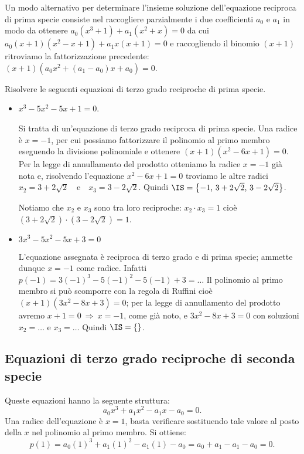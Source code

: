Un modo alternativo per determinare l'insieme soluzione dell'equazione reciproca di prima specie consiste nel raccogliere parzialmente i due coefficienti $a_0$ e $a_1$ in modo da ottenere $a_0\left(x^3+1\right)+a_1\left(x^2+x\right)=0$ da cui $a_0(x+1)\left(x^2-x+1\right)+a_1x(x+1)=0$ e raccogliendo il binomio $(x+1)$ ritroviamo la fattorizzazione precedente: $(x+1) \left(a_0x^2+(a_1-a_0)x+a_0\right)=0$.
\begin{exrig}
 \begin{esempio}
 Risolvere le seguenti equazioni di terzo grado reciproche di prima specie.

 \begin{itemize}
 \item $x^3-5x^2-5x+1=0$.

 Si tratta di un'equazione di terzo grado reciproca di prima specie. Una radice è $x=-1$, per cui possiamo fattorizzare il polinomio al primo membro eseguendo la divisione polinomiale e ottenere $(x+1)\left(x^2-6x+1\right)=0$. Per la legge di annullamento del prodotto otteniamo la radice $x=-1$ già nota e, risolvendo l'equazione $x^2-6x+1=0$ troviamo le altre radici $x_2=3+2\sqrt 2$~~e~~$x_3=3-2\sqrt 2$. Quindi $\IS=\left\{-1\text{, }3+2\sqrt 2\text{, }3-2\sqrt 2\right\}$.

 Notiamo che $x_2$ e $x_3$ sono tra loro reciproche: $x_2 \cdot x_3=1$ cioè $(3+2\sqrt 2)\cdot (3-2\sqrt 2)=1$.

 \item $3x^3-5x^2-5x+3=0$

 L'equazione assegnata è reciproca di terzo grado e di prima specie; ammette dunque $x=-1$ come radice. Infatti $p(-1)=3(-1)^3-5(-1)^2-5(-1)+3=\ldots$ Il polinomio al primo membro si può scomporre con la regola di Ruffini cioè $(x+1)\left(3x^2-8x+3\right)=0$; per la legge di annullamento del prodotto avremo $x+1=0\:\Rightarrow\: x=-1$, come già noto, e $3x^2-8x+3=0$ con soluzioni $x_2=\ldots $ e $x_3=\ldots$ Quindi $\IS=\{\dotfill \}$.
 \end{itemize}
 \end{esempio}
\end{exrig}
\ovalbox{\risolvii  \ref{ese:5.36}, \ref{ese:5.37}, \ref{ese:5.38}, \ref{ese:5.39}}

\subsection{Equazioni di terzo grado reciproche di seconda specie}

Queste equazioni hanno la seguente struttura:
\[a_0x^3+a_1x^2-a_1x-a_0=0.\]
Una radice dell'equazione è $x=1$, basta verificare sostituendo tale valore al posto della $x$ nel polinomio al primo membro. Si ottiene: \[p(1)=a_0(1)^3+a_1(1)^2-a_1(1)-a_0=a_0+a_1-a_1-a_0=0.\]

